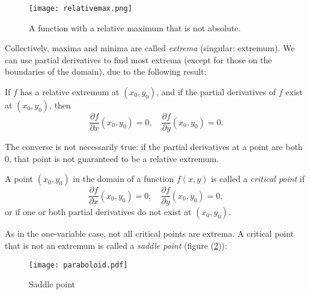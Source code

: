 \begin{figure}[H]
\centering
 \texttt{[image: relativemax.png]}
\caption{A function with a relative maximum that is not absolute.}
\label{relmaxnabs}
\end{figure}


  Collectively, maxima and minima are called \emph{extrema} (singular: extremum).  We can use partial derivatives to find most extrema (except for those on the boundaries of the domain), due to the following result:

  \begin{theorem}
    If $f$ has a relative extremum at $(x_0, y_0)$, and if the partial derivatives of $f$ exist at $(x_0, y_0)$, then
      \[
        \frac{\partial f}{\partial x}(x_0, y_0) = 0, \quad \frac{\partial f}{\partial y}(x_0, y_0) = 0.
      \]
  \end{theorem}

  The converse is not necessarily true: if the partial derivatives at a point are both $0$, that point is not guaranteed to be a relative extremum.

  \begin{definition}
    A point $(x_0, y_0)$ in the domain of a function $f(x, y)$ is called a \emph{critical point} if
      \[
        \frac{\partial f}{\partial x}(x_0, y_0) = 0, \quad \frac{\partial f}{\partial y}(x_0, y_0) = 0,
      \]
    or if one or both partial derivatives do not exist at $(x_0, y_0)$.
  \end{definition}

  As in the one-variable case, not all critical points are extrema.  A critical point that is not an extremum is called a \emph{saddle point} (figure (\ref{saddle})):

  \begin{figure}[H]
    \centering
    \texttt{[image: paraboloid.pdf]}
    \caption{Saddle point}
    \label{saddle}
  \end{figure}

